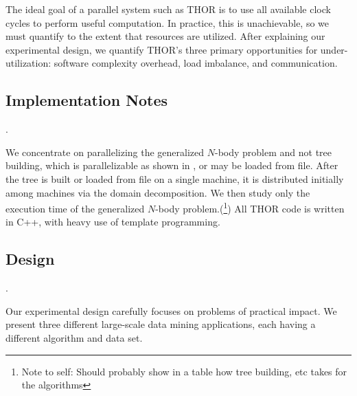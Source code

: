 \documentclass[twoside,leqno,twocolumn]{article}
\newcommand{\authornote}[1]{(\footnote{Note to self: #1})}
\newcommand{\authorsnote}[1]{\authornote{#1}}
\newcommand{\mysub}[1]{\subsection{#1}. }
\begin{document}
The ideal goal of a parallel system such as THOR is to use all available clock cycles to perform useful computation.
In practice, this is unachievable, so we must quantify to the extent that resources are utilized.
After explaining our experimental design, we quantify THOR's three primary opportunities for under-utilization: software complexity overhead, load imbalance, and communication.

\mysub{Implementation Notes}

We concentrate on parallelizing the generalized $N$-body problem and not tree building, which is parallelizable as shown in \cite{alfuraih00parallel}, or may be loaded from file.
After the tree is built or loaded from file on a single machine, it is distributed initially among machines via the domain decomposition.
We then study only the execution time of the generalized $N$-body problem.\authorsnote{Should probably show in a table how tree building, etc takes for the algorithms}
All THOR code is written in C++, with heavy use of template programming.

\mysub{Design}


Our experimental design carefully focuses on problems of practical impact.
We present three different large-scale data mining applications, each having a different algorithm and data set.


%
%
%
\end{document}
